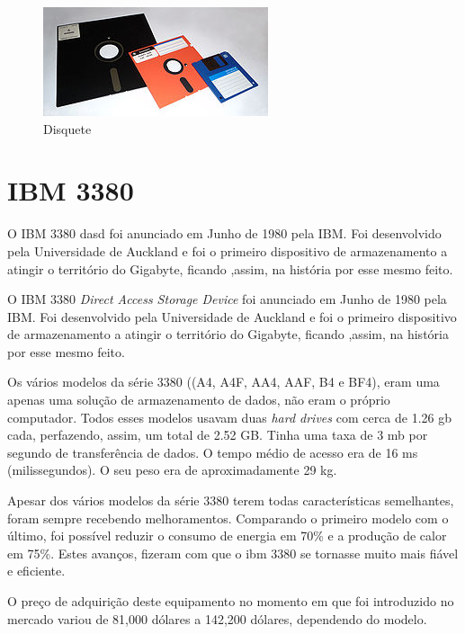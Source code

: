 \documentclass{report}
\begin{document}
	
	\begin{figure} [h]
		\centering
		\includegraphics[scale=1]{disquete.jpg}
		\caption{Disquete}
	\end{figure}
	
\newpage		
		
		\section{IBM 3380}	
	O IBM 3380 \ac{dasd} foi anunciado em Junho de 1980 pela IBM. Foi desenvolvido pela Universidade de Auckland e foi o primeiro dispositivo de armazenamento a atingir o território do Gigabyte, ficando ,assim, na história por esse mesmo feito.
		
	O IBM 3380 \textit{Direct Access Storage Device}  foi anunciado em Junho de 1980 pela IBM. Foi desenvolvido pela Universidade de Auckland e foi o primeiro dispositivo de armazenamento a atingir o território do Gigabyte, ficando ,assim, na história por esse mesmo feito.
\vspace{1mm}
	
	Os vários modelos da série 3380 ((A4, A4F, AA4, AAF, B4 e BF4), eram uma apenas uma solução de armazenamento de dados, não eram o próprio computador. Todos esses modelos usavam duas \textit{hard drives} com cerca de 1.26 \ac{gb} cada, perfazendo, assim, um total de 2.52 GB. Tinha uma taxa de 3 \ac{mb} por segundo de transferência de dados. O tempo médio de acesso era de 16 ms (milissegundos). O seu peso era de aproximadamente 29 kg. 
\vspace{1mm}

	
	Apesar dos vários modelos da série 3380 terem todas características semelhantes, foram sempre recebendo melhoramentos. Comparando o primeiro modelo com o último, foi possível reduzir o consumo de energia em 70\% e a produção de calor em 75\%. Estes avanços, fizeram com que o \ac{ibm} 3380 se tornasse muito mais fiável e eficiente.
\vspace{1mm}

	O preço de adquirição deste equipamento no momento em que foi introduzido no mercado variou de 81,000 dólares a 142,200 dólares, dependendo do modelo.
\vspace{1mm}
\end{document}
